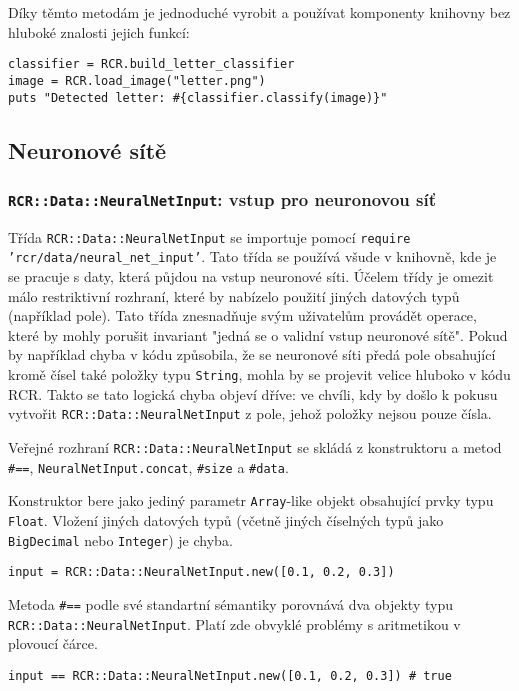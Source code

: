 \documentclass[a4paper]{article}
\begin{document}
Díky těmto metodám je jednoduché vyrobit a používat komponenty knihovny
bez hluboké znalosti jejich funkcí:
\begin{lstlisting}
classifier = RCR.build_letter_classifier
image = RCR.load_image("letter.png")
puts "Detected letter: #{classifier.classify(image)}"
\end{lstlisting}

\subsection{Neuronové sítě}
\subsubsection{\texttt{RCR::Data::NeuralNetInput}: vstup pro neuronovou síť}
Třída \texttt{RCR::Data::NeuralNetInput} se importuje pomocí \texttt{require
'rcr/data/neural\_net\_input'}. Tato třída se používá všude v knihovně, kde
je se pracuje s daty, která půjdou na vstup neuronové síti. Účelem třídy
je omezit málo restriktivní rozhraní, které by nabízelo použití jiných datových
typů (například pole). Tato třída znesnadňuje svým uživatelům provádět operace,
které by mohly porušit invariant "jedná se o validní vstup neuronové sítě".
Pokud by například chyba v kódu způsobila, že se neuronové síti předá pole
obsahující kromě čísel také položky typu \texttt{String}, mohla by se projevit
velice hluboko v kódu RCR. Takto se tato logická chyba objeví dříve: ve chvíli,
kdy by došlo k pokusu vytvořit \texttt{RCR::Data::NeuralNetInput} z pole,
jehož položky nejsou pouze čísla.

Veřejné rozhraní \texttt{RCR::Data::NeuralNetInput} se skládá z konstruktoru a
metod \texttt{\#==}, \texttt{NeuralNetInput.concat}, \texttt{\#size} a \texttt{\#data}.

Konstruktor bere jako jediný parametr \texttt{Array}-like objekt obsahující
prvky typu \texttt{Float}. Vložení jiných datových typů (včetně jiných číselných
typů jako \texttt{BigDecimal} nebo \texttt{Integer}) je chyba.
\begin{lstlisting}
input = RCR::Data::NeuralNetInput.new([0.1, 0.2, 0.3])
\end{lstlisting}

Metoda \texttt{\#==} podle své standartní sémantiky porovnává dva objekty typu
\texttt{RCR::Data::NeuralNetInput}. Platí zde obvyklé problémy s aritmetikou
v plovoucí čárce.
\begin{lstlisting}
input == RCR::Data::NeuralNetInput.new([0.1, 0.2, 0.3]) # true
\end{lstlisting}
\end{document}
